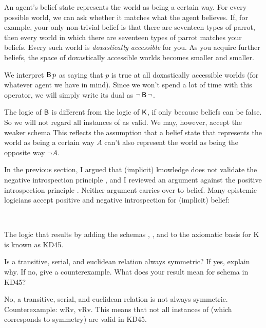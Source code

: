 An agent's belief state represents the world as being a certain way. For every
possible world, we can ask whether it matches what the agent believes. If, for
example, your only non-trivial belief is that there are seventeen types of
parrot, then every world in which there are seventeen types of parrot matches
your beliefs. Every such world is \emph{doxastically accessible} for you. As you
acquire further beliefs, the space of doxastically accessible worlds becomes
smaller and smaller.

We interpret $\operatorname{\mathsf{B}} p$ as saying that $p$ is true at all doxastically accessible
worlds (for whatever agent we have in mind). Since we won't spend a lot of time
with this operator, we will simply write its dual as $\neg\operatorname{\mathsf{B}}\neg$.

The logic of $\operatorname{\mathsf{B}}$ is different from the logic of $\operatorname{\mathsf{K}{}}$, if only because
beliefs can be false. So we will not regard all instances of 
%
%
as valid. We may, however, accept the weaker schema
%
%
This reflects the assumption that a belief state that represents the world as
being a certain way $A$ can't also represent the world as being the opposite way
$\neg A$.

In the previous section, I argued that (implicit) knowledge does not validate
the negative introspection principle , and I reviewed an argument against
the positive introspection principle . Neither argument carries over to
belief. Many epistemic logicians accept positive and negative introspection for
(implicit) belief:
%
\begin{principles}
  \\
\end{principles}

The logic that results by adding the schemas , , and  to the
axiomatic basis for K is known as KD45.

\begin{exercise}
  Is a transitive, serial, and euclidean relation always symmetric? If yes,
  explain why. If no, give a counterexample. What does your result mean for
  schema  in KD45?
\end{exercise}
\begin{solution}
  No, a transitive, serial, and euclidean relation is not always symmetric.
  Counterexample: wRv, vRv. This means that not all instances of  (which
  corresponds to symmetry) are valid in KD45.
\end{solution}

